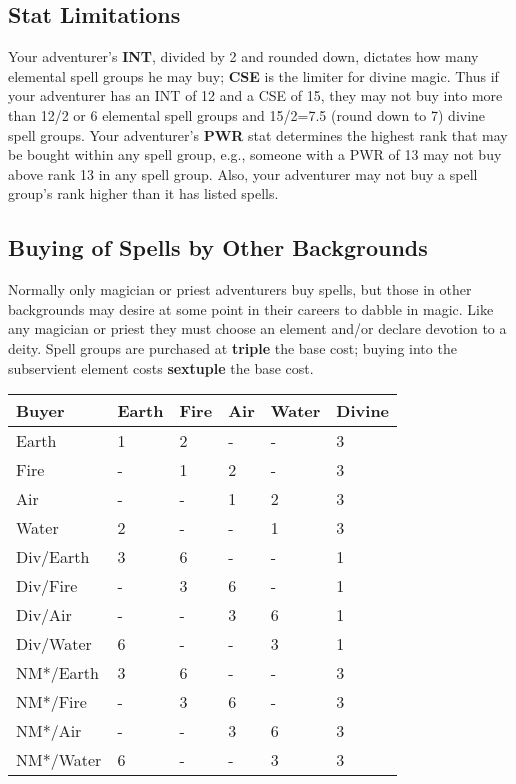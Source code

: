\begin{multicols*}{2}
\subsection{Stat Limitations}
Your adventurer's \textbf{INT}, divided by 2 and rounded down, dictates how many elemental spell groups he may buy; \textbf{CSE} is the limiter for divine magic. Thus if your adventurer has an INT of 12 and a CSE of 15, they may not buy into more than 12/2 or 6 elemental spell groups and 15/2=7.5 (round down to 7) divine spell groups.
Your adventurer's \textbf{PWR} stat determines the highest rank that may be bought within any spell group, e.g., someone with a PWR of 13 may not buy above rank 13 in any spell group. Also, your adventurer may not buy a spell group's rank higher than it has listed spells.
\subsection{Buying of Spells by Other Backgrounds}
Normally only magician or priest adventurers buy spells, but those in other backgrounds may desire at some point in their careers to dabble in magic. Like any magician or priest they must choose an element and/or declare devotion to a deity. Spell groups are purchased at \textbf{triple} the base cost; buying into the subservient element costs \textbf{sextuple} the base cost.

\begin{tcolorbox}[breakable,boxrule=0pt,title=\textbf{Spell Cost Multiplier}]
\begin{tabular}{l l l l l l}
\textbf{Buyer} & \textbf{Earth}  & \textbf{Fire} & \textbf{Air} & \textbf{Water}  & \textbf{Divine}\\
\midrule
Earth & 1 & 2 & - & - & 3\\
Fire & - & 1 & 2 & - & 3\\
Air & - & - & 1 & 2 & 3\\
Water & 2 & - & - & 1 & 3\\
Div/Earth & 3 & 6 & - & - & 1\\
Div/Fire & - & 3 & 6 & - & 1\\
Div/Air & - & - & 3 & 6 & 1\\
Div/Water & 6 & - & - & 3 & 1\\
NM*/Earth & 3 & 6 & - & - & 3\\
NM*/Fire & - & 3 & 6 & - & 3\\
NM*/Air & - & - & 3 & 6 & 3\\
NM*/Water & 6 & - & - & 3 & 3\\
\end{tabular}
\end{tcolorbox}


\end{multicols*}

